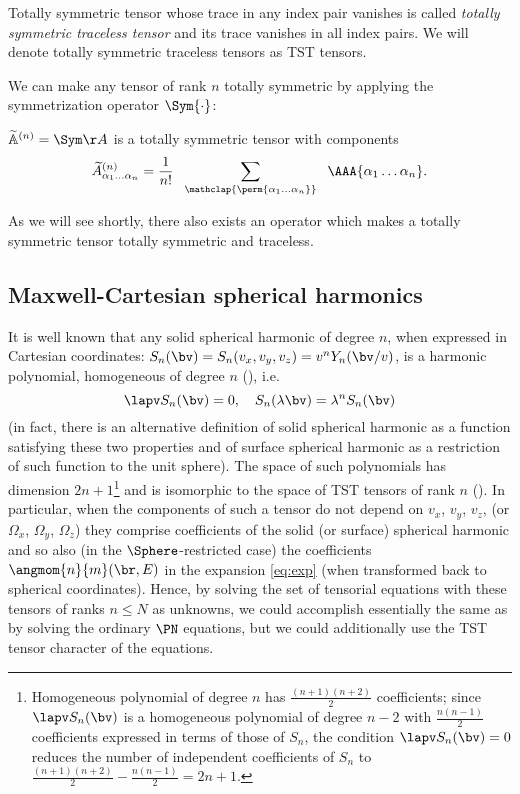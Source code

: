 \begin{definition}
  Totally symmetric tensor whose trace in any index pair vanishes is called \textit{totally symmetric traceless tensor} 
  and its trace vanishes in all index pairs. We will denote totally symmetric traceless tensors as TST tensors.
\end{definition}

We can make any tensor of rank $n$ totally symmetric by applying the symmetrization operator $\Sym{\cdot}$:
\begin{definition}
  $\widetilde{\mathbb{A}}^{(n)} = \Sym\AA$ is a totally symmetric tensor with components
  $$
    \widetilde A^{(n)}_{\alpha_1\ldots\alpha_n} = \frac{1}{n!}\ \; \sum_{\mathclap{\perm{\alpha_1\ldots\alpha_n}}}\ \;\AAA{\alpha_1\ldots\alpha_n}.
  $$
\end{definition}  
As we will see shortly, there also exists an operator which makes a totally symmetric tensor totally symmetric and traceless.

\subsection{Maxwell-Cartesian spherical harmonics}\label{sec:MCSH}
It is well known that any solid spherical harmonic of degree $n$, when expressed in Cartesian coordinates: $S_n(\bv) =
S_n(v_x, v_y, v_z) = v^n Y_n(\bv/v)$, is a harmonic polynomial, homogeneous of degree $n$ (\cite[Art. 110]{Byerly}),
i.e.
$$
  \lapv S_n(\bv) = 0,\quad S_n(\lambda\bv) = \lambda^n S_n(\bv)
$$ (in fact, there is an alternative definition of solid spherical harmonic as a function satisfying these two
properties and of surface spherical harmonic as a restriction of such function to the unit sphere). The space of such
polynomials has dimension $2n + 1$\footnote{Homogeneous polynomial of degree $n$ has $\frac{(n+1)(n+2)}{2}$
coefficients; since $\lapv S_n(\bv)$ is a homogeneous polynomial of degree $n-2$ with $\frac{n(n-1)}{2}$ coefficients
expressed in terms of those of $S_n$, the condition $\lapv S_n(\bv) = 0$ reduces the number of independent coefficients
of $S_n$ to $\frac{(n+1)(n+2)}{2} - \frac{n(n-1)}{2} = 2n + 1$.}\label{pg:indepc} and is isomorphic to the space of TST
tensors of rank $n$ (\cite{Sam}).
In particular, when the components of such a tensor do not depend on $v_x$, $v_y$, $v_z$, (or $\Omega_x$, $\Omega_y$,
$\Omega_z$) they comprise coefficients of the solid (or surface) spherical harmonic and so also (in the
$\Sphere$-restricted case) the coefficients $\angmom{n}{m}(\br,E)$ in the expansion \eqref{eq:exp} (when transformed
back to spherical coordinates). Hence, by solving the set of tensorial equations with these tensors of ranks $n \leq N$
as unknowns, we could accomplish essentially the same as by solving the ordinary $\PN$ equations, but we could
additionally use the TST tensor character of the equations.

